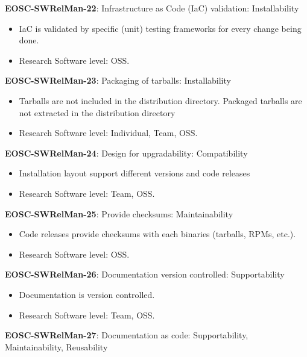 \textbf{EOSC-SWRelMan-22}: Infrastructure as Code (IaC) validation: Installability

\begin{itemize}
    \item IaC is validated by specific (unit) testing frameworks for every change being done.~\cite{orviz_fernandez_eosc-synergy_2020}
    \item Research Software level: OSS.
\end{itemize}

\textbf{EOSC-SWRelMan-23}: Packaging of tarballs: Installability

\begin{itemize}
    \item Tarballs are not included in the distribution directory. Packaged tarballs are not extracted in the distribution directory~\cite{raymond_software_2013}
    \item Research Software level: Individual, Team, OSS.
\end{itemize}

\textbf{EOSC-SWRelMan-24}: Design for upgradability: Compatibility

\begin{itemize}
    \item Installation layout support different versions and code releases~\cite{raymond_software_2013}
    \item Research Software level: Team, OSS.
\end{itemize}

\textbf{EOSC-SWRelMan-25}: Provide checksums: Maintainability

\begin{itemize}
    \item Code releases provide checksums with each binaries (tarballs, RPMs, etc.).~\cite{raymond_software_2013}
    \item Research Software level: OSS.
\end{itemize}

\textbf{EOSC-SWRelMan-26}: Documentation version controlled: Supportability

\begin{itemize}
    \item Documentation is version controlled.~\cite{orviz_fernandez_eosc-synergy_2020}
    \item Research Software level: Team, OSS.
\end{itemize}

\textbf{EOSC-SWRelMan-27}: Documentation as code: Supportability, Maintainability, Reusability

